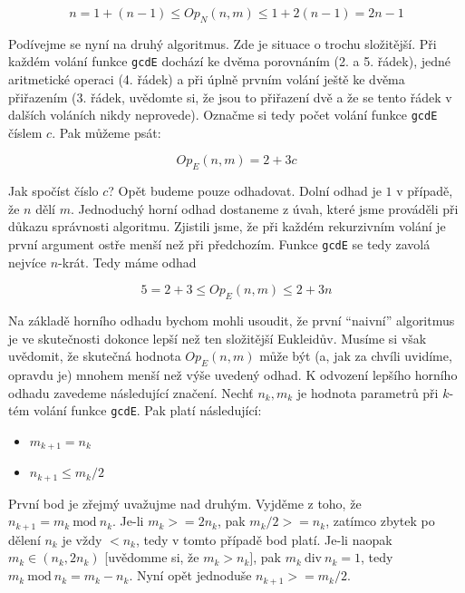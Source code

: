 \begin{displaymath}
 n = 1 + (n-1) \leq Op_N(n,m) \leq 1 + 2(n-1) = 2n - 1
\end{displaymath}


Podívejme se nyní na druhý algoritmus. Zde je situace o trochu složitější. Při každém volání funkce {\tt gcdE} dochází ke 
dvěma porovnáním (2. a 5. řádek), jedné aritmetické operaci (4. řádek) a při úplně prvním volání ještě ke dvěma přiřazením 
(3. řádek, uvědomte si, že jsou to přiřazení dvě a že se tento řádek v dalších
voláních nikdy neprovede). Označme si tedy počet volání funkce {\tt gcdE} číslem $c$. Pak můžeme psát:

\begin{displaymath}
Op_E(n,m) = 2 + 3c
\end{displaymath}

Jak spočíst číslo $c$? Opět budeme pouze odhadovat. Dolní odhad je $1$ v případě, že $n$ dělí $m$. Jednoduchý horní odhad dostaneme
z úvah, které jsme prováděli při důkazu správnosti algoritmu. Zjistili jsme, že při každém rekurzivním volání je první argument ostře 
menší než při předchozím. Funkce {\tt gcdE} se tedy zavolá nejvíce $n$-krát. Tedy máme odhad

\begin{displaymath}
 5 = 2+3\leq Op_E(n,m) \leq 2 + 3n
\end{displaymath}

Na základě horního odhadu bychom mohli usoudit, že první ``naivní'' algoritmus je ve skutečnosti dokonce lepší než ten složitější
Eukleidův. Musíme si však uvědomit, že skutečná hodnota $Op_E(n,m)$ může být (a, jak za chvíli
uvidíme, opravdu je) mnohem menší než výše uvedený odhad. K odvození lepšího horního odhadu zavedeme následující značení. Nechť
$n_k,m_k$ je hodnota parametrů při $k$-tém volání funkce {\tt gcdE}. Pak platí následující:

\begin{itemize}
 \item $m_{k+1}=n_k$
 \item $n_{k+1}\leq m_k/2$
\end{itemize}

První bod je zřejmý uvažujme nad druhým. Vyjděme z toho, že $n_{k+1} = m_k\ \mbox{mod}\ n_k$. Je-li $m_k>=2n_k$, pak $m_k/2>=n_k$, zatímco
zbytek po dělení $n_k$ je vždy $< n_k$, tedy v tomto případě bod platí. Je-li naopak $m_k \in (n_k, 2n_k)$ [uvědomme si, že $m_k > n_k]$, pak 
$m_k\ \mbox{div}\ n_k = 1$, tedy $m_k\ \mbox{mod}\ n_k = m_k-n_k$. Nyní opět jednoduše $n_{k+1} >= m_k/2$. 

